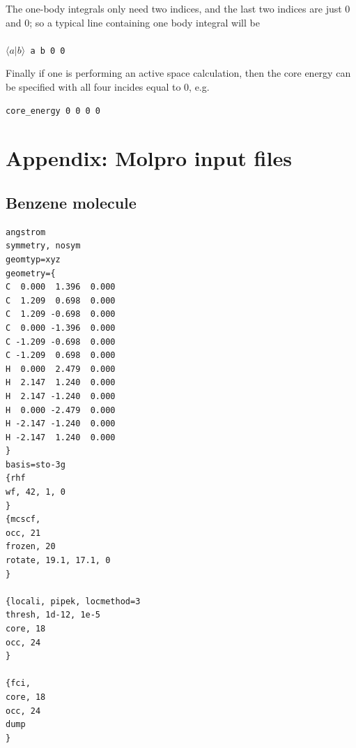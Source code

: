 \documentclass[letterpaper,12pt,aps, pra]{revtex4-1}
\begin{document}
The one-body integrals only need two indices, and the last two indices are just 0 and 0; so a typical line containing one body integral will be\\
\texttt{
\\$\langle a|b\rangle$ a b 0 0\\}

Finally if one is performing an active space calculation, then the core energy can be specified with all four incides equal to 0, e.g.
\begin{verbatim}
core_energy 0 0 0 0
\end{verbatim}


%

 \section{Appendix: Molpro input files}\label{sec:appMolpro}

 \subsection{Benzene molecule}
{
\begin{verbatim}
angstrom
symmetry, nosym
geomtyp=xyz
geometry={
C  0.000  1.396  0.000
C  1.209  0.698  0.000
C  1.209 -0.698  0.000
C  0.000 -1.396  0.000
C -1.209 -0.698  0.000
C -1.209  0.698  0.000
H  0.000  2.479  0.000
H  2.147  1.240  0.000
H  2.147 -1.240  0.000
H  0.000 -2.479  0.000
H -2.147 -1.240  0.000
H -2.147  1.240  0.000
}
basis=sto-3g
{rhf
wf, 42, 1, 0
}
{mcscf,
occ, 21
frozen, 20
rotate, 19.1, 17.1, 0
}

{locali, pipek, locmethod=3
thresh, 1d-12, 1e-5
core, 18
occ, 24
}

{fci,
core, 18
occ, 24
dump
}
\end{verbatim}
}
\end{document}
